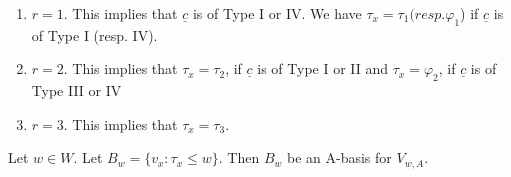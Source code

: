 \begin{enumerate}[(1)]
\item $r=1$. This implies that $ \underline{c}$ is of Type I or IV. We have $\tau_{x}= \tau_{1} (resp. \varphi_{1}$) if $\underline{c}$ is of Type I (resp. IV).

\item $r=2$. This implies that $ \tau_{x}= \tau_{2}$, if $\underline{c}$ is of Type I or II and $\tau_{x}= \varphi_{2}$, if $\underline{c}$ is of Type III or IV

\item $r=3$. This implies that $\tau_{x} = \tau_{3}$.
\end{enumerate}

\setcounter{definition}{1}
\begin{secthm}\label{chap9-thm-7.2}
Let $ w \in W$. Let $B_{w} = \{ v_{x} : \tau_{x}\leq w\}$. Then $B_{w}$ be an A-basis for $V_{w,A}$.
\end{secthm}

